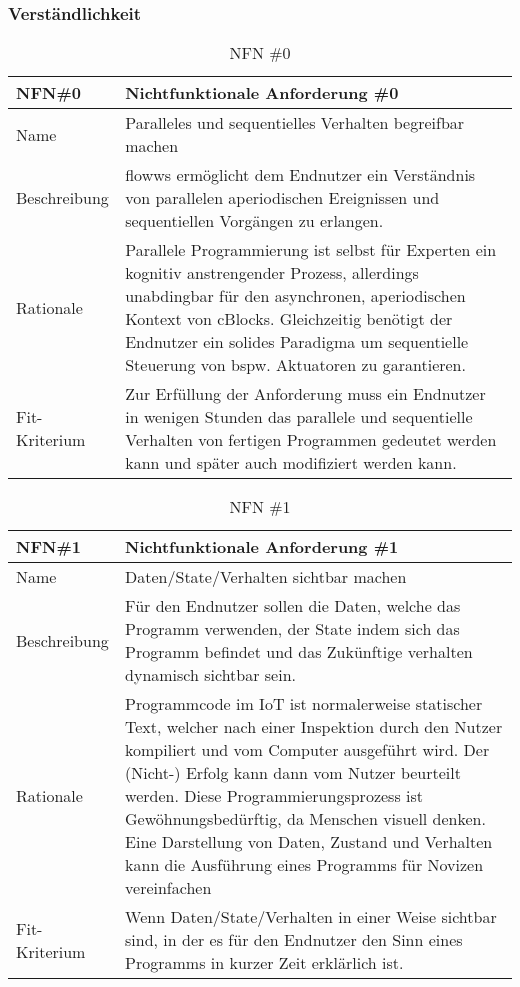 \subsubsection{Verständlichkeit}
\begin{table}[H]
\caption{NFN \#0}
\label{tab:nfn0}
\begin{tabularx}{\textwidth}{lX}
\hline
\rowcolor[HTML]{EFEFEF} 
NFN\#0        & Nichtfunktionale Anforderung \#0 \\ \hline
Name          & Paralleles und sequentielles Verhalten begreifbar machen \\ \hline
Beschreibung  & flowws ermöglicht dem Endnutzer ein Verständnis von parallelen aperiodischen Ereignissen und sequentiellen Vorgängen zu erlangen. \\ \hline
Rationale     & Parallele Programmierung ist selbst für Experten ein kognitiv anstrengender Prozess, allerdings unabdingbar für den asynchronen, aperiodischen Kontext von cBlocks. Gleichzeitig benötigt der Endnutzer ein solides Paradigma um sequentielle Steuerung von bspw. Aktuatoren zu garantieren. \\ \hline
Fit-Kriterium & Zur Erfüllung der Anforderung muss ein Endnutzer in wenigen Stunden das parallele und sequentielle Verhalten von fertigen Programmen gedeutet werden kann und später auch modifiziert werden kann.\\ \hline
\end{tabularx}
\end{table}


\begin{table}[H]
\caption{NFN \#1}
\label{tab:nfn1}
\begin{tabularx}{\textwidth}{lX}
\hline
\rowcolor[HTML]{EFEFEF} 
NFN\#1        & Nichtfunktionale Anforderung \#1\\ \hline
Name          & Daten/State/Verhalten sichtbar machen\\ \hline
Beschreibung  & Für den Endnutzer sollen die Daten, welche das Programm verwenden, der State indem sich das Programm befindet und das Zukünftige verhalten dynamisch sichtbar sein.\\ \hline
Rationale     & Programmcode im IoT ist normalerweise statischer Text, welcher nach einer Inspektion durch den Nutzer kompiliert und vom Computer ausgeführt wird. Der (Nicht-) Erfolg kann dann vom  Nutzer beurteilt werden. Diese Programmierungsprozess ist Gewöhnungsbedürftig, da Menschen visuell denken. Eine Darstellung von Daten, Zustand und Verhalten kann die Ausführung eines Programms für Novizen vereinfachen \\ \hline
Fit-Kriterium & Wenn Daten/State/Verhalten in einer Weise sichtbar sind, in der es für den Endnutzer den Sinn eines Programms in kurzer Zeit erklärlich ist.\\ \hline
\end{tabularx}
\end{table}

